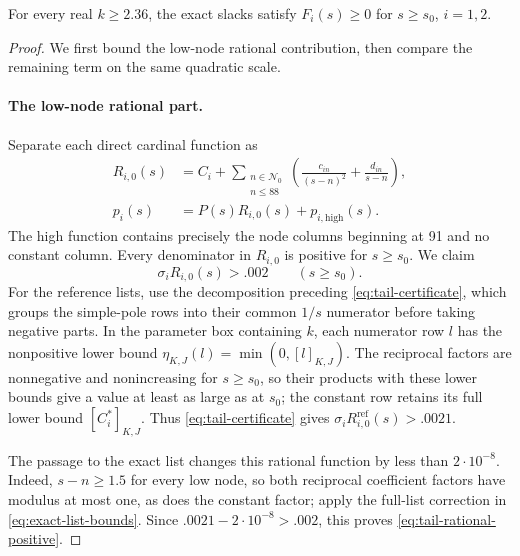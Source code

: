 \begin{lemma}\label{lem:tail-signs}
For every real \(k\ge2.36\), the exact slacks satisfy \(F_i(s)\ge0\) for
\(s\ge s_0\), \(i=1,2\).
\end{lemma}

\begin{proof}
We first bound the low-node rational contribution, then compare the remaining
term on the same quadratic scale.

\paragraph{The low-node rational part.}
Separate each direct cardinal function as
\begin{align*}
 R_{i,0}(s)
 &=C_i+\sum_{\substack{n\in\mathcal N_0\\n\le88}}
       \left(\frac{c_{in}}{(s-n)^2}+\frac{d_{in}}{s-n}\right),\\
 p_i(s)&=P(s)R_{i,0}(s)+p_{i,\mathrm{high}}(s).
\end{align*}
The high function contains precisely the node columns beginning at 91 and no
constant column.  Every denominator in \(R_{i,0}\) is positive for
\(s\ge s_0\).  We claim
\begin{equation}\label{eq:tail-rational-positive}
 \sigma_iR_{i,0}(s)>.002\qquad(s\ge s_0).
\end{equation}
For the reference lists, use the decomposition preceding
\eqref{eq:tail-certificate}, which groups the simple-pole rows into their
common \(1/s\) numerator before taking negative parts.  In the parameter
box containing \(k\), each numerator row \(l\) has the nonpositive lower
bound \(\eta_{K,J}(l)=\min(0,[l]_{K,J})\).  The reciprocal factors are
nonnegative and nonincreasing for \(s\ge s_0\), so their products with these
lower bounds give a value
at least as large as at \(s_0\); the constant row retains its full lower
bound \([C_i^*]_{K,J}\).  Thus \eqref{eq:tail-certificate} gives
\(\sigma_iR_{i,0}^{\mathrm{ref}}(s)>.0021\).

The passage to the exact list changes this rational function by less than
\(2\cdot10^{-8}\).  Indeed, \(s-n\ge1.5\) for every low node, so both
reciprocal coefficient factors have modulus at most one, as does the constant
factor; apply the full-list correction in \eqref{eq:exact-list-bounds}.
Since \(.0021-2\cdot10^{-8}>.002\), this proves
\eqref{eq:tail-rational-positive}.


\end{proof}
